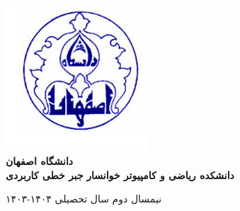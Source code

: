 \documentclass[12pt]{book}
\begin{document}
\begin{titlepage}  
	\centering  
	\includegraphics[width=0.4\textwidth]{logo.jpg}\\ %
	\Large
\textbf{	دانشگاه اصفهان} \\
	\vspace{5mm}
	\large
	\textbf{دانشکده ریاضی و کامپیوتر خوانسار}
	\vfill %
	\huge  
	\textbf{جبر خطی کاربردی}  
	
	\vspace{0.5cm} %
	\Large  
	\vfill %
	\large  
	نیمسال دوم سال تحصیلی ۱۴۰۴-۱۴۰۳ 
\end{titlepage} 
\tableofcontents



%
\end{document}
